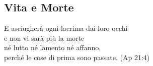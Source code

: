 \documentclass[12pt,a4paper,twoside,openany]{book}
\begin{document}
\pagebreak

\subsection{Vita e Morte}\label{morire}

\begin{changemargin}{0.3cm}{0.3cm}\begin{enfasi}{E asciugherà ogni lacrima dai loro occhi\\
e non vi sarà più la morte\\
né lutto né lamento né affanno,\\
perché le cose di prima sono passate. (Ap 21:4)
}\end{enfasi}\end{changemargin}\medskip
\end{document}
